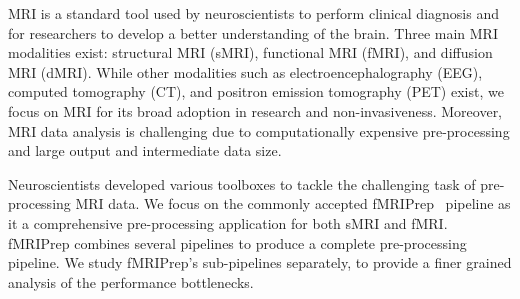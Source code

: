 \documentclass[conference]{IEEEtran}
\newcommand{\HL}[1]{\hl{#1}}
\begin{document}



MRI is a standard tool used by neuroscientists to perform clinical diagnosis and for researchers to develop a better understanding of the brain. Three main MRI modalities exist: structural MRI (sMRI), functional MRI (fMRI), and diffusion MRI (dMRI). While other modalities such as electroencephalography (EEG), computed tomography (CT), and positron emission tomography (PET) exist, we focus on MRI for its broad adoption in research and non-invasiveness. Moreover, MRI data analysis is challenging due to computationally expensive pre-processing and large output and intermediate data size.

Neuroscientists developed various toolboxes to tackle the challenging task of pre-processing MRI data. We focus on the commonly accepted fMRIPrep~\cite{Esteban2019-bl} pipeline as it a comprehensive pre-processing application for both sMRI and fMRI. fMRIPrep combines several pipelines to produce a complete pre-processing pipeline. We study fMRIPrep's sub-pipelines separately, to provide a finer grained analysis of the performance bottlenecks.
\end{document}

